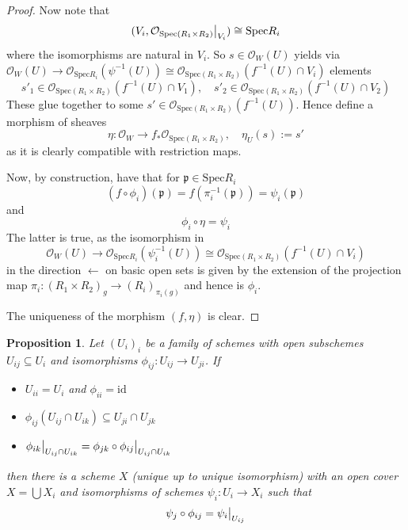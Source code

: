 \documentclass{scrartcl}
\newcommand{\p}{\mathfrak{p}}
\newcommand{\Spec}{\mathrm{Spec}}
\renewcommand{\O}{\mathcal{O}}
\newcommand\restr[2]{{
    \left.\kern-\nulldelimiterspace
    #1
    \vphantom{\big|}
    \right|_{#2}
}}
\newtheorem{prop}{Proposition}[section]
\theoremstyle{definition}
\begin{document}
\begin{proof}
    Now note that
    \begin{equation*}
        (V_i, \restr{\O_{\Spec(R_1 \times R_2)}}{V_i}) \cong \Spec R_i
    \end{equation*}
    where the isomorphisms are natural in $V_i$.
    So $s \in \O_W(U)$ yields via $\O_W(U) \to \O_{\Spec R_i}(\psi^{-1}(U)) \cong \O_{\Spec(R_1 \times R_2)}(f^{-1}(U) \cap V_i)$ elements
    \begin{equation*}
        s'_1 \in \O_{\Spec(R_1 \times R_2)}(f^{-1}(U) \cap V_1), \quad s'_2 \in \O_{\Spec(R_1 \times R_2)}(f^{-1}(U) \cap V_2)
    \end{equation*}
    These glue together to some $s' \in \O_{\Spec(R_1 \times R_2)}(f^{-1}(U))$.
    Hence define a morphism of sheaves
    \begin{equation*}
        \eta: \O_W \to f_*\O_{\Spec(R_1 \times R_2)}, \quad \eta_U(s) := s'
    \end{equation*}
    as it is clearly compatible with restriction maps.

    Now, by construction, have that for $\p \in \Spec R_i$
    \begin{equation*}
        (f \circ \phi_i)(\p) = f(\pi_i^{-1}(\p)) = \psi_i(\p)
    \end{equation*}
    and
    \begin{equation*}
        \phi_i \circ \eta = \psi_i
    \end{equation*}
    The latter is true, as the isomorphism in
    \begin{equation*}
        \O_W(U) \to \O_{\Spec R_i}(\psi_i^{-1}(U)) \cong \O_{\Spec(R_1 \times R_2)}(f^{-1}(U) \cap V_i)
    \end{equation*}
    in the direction $\leftarrow$ on basic open sets is given by the extension of the projection map $\pi_i: (R_1 \times R_2)_g \to (R_i)_{\pi_i(g)}$ and hence is $\phi_i$.

    The uniqueness of the morphism $(f, \eta)$ is clear.
\end{proof}
\begin{prop}
    Let $(U_i)_i$ be a family of schemes with open subschemes $U_{ij} \subseteq U_i$ and isomorphisms $\phi_{ij}: U_{ij} \to U_{ji}$.
    If
    \begin{itemize}
        \item $U_{ii} = U_i$ and $\phi_{ii} = \mathrm{id}$
        \item $\phi_{ij}(U_{ij} \cap U_{ik}) \subseteq U_{ji} \cap U_{jk}$
        \item $\restr{\phi_{ik}}{U_{ij} \cap U_{ik}} = \phi_{jk} \circ \restr{\phi_{ij}}{U_{ij} \cap U_{ik}}$
    \end{itemize}
    then there is a scheme $X$ (unique up to unique isomorphism) with an open cover $X = \bigcup X_i$ and isomorphisms of schemes $\psi_i: U_i \to X_i$ such that
    \begin{equation*}
        \psi_j \circ \phi_{ij} = \restr{\psi_i}{U_{ij}}
    \end{equation*}
\end{prop}
\end{document}

